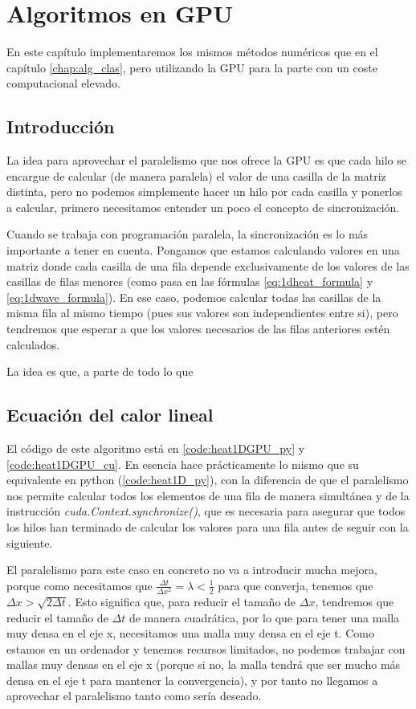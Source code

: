 \chapter{Algoritmos en \ac{GPU}}\label{cap:alg_gpu}
\begin{resumen}
	En este capítulo implementaremos los mismos métodos numéricos que en el capítulo \ref{chap:alg_clas}, pero utilizando la \ac{GPU} para la parte con un coste computacional elevado.
\end{resumen}
\section{Introducción}
La idea para aprovechar el paralelismo que nos ofrece la \ac{GPU} es que cada hilo se encargue de calcular (de manera paralela) el valor de una casilla de la matriz distinta, pero no podemos simplemente hacer un hilo por cada casilla y ponerlos a calcular, primero necesitamos entender un poco el concepto de sincronización.

Cuando se trabaja con programación paralela, la sincronización es lo más importante a tener en cuenta. Pongamos que estamos calculando valores en una matriz donde cada casilla de una fila depende exclusivamente de los valores de las casillas de filas menores (como pasa en las fórmulas \eqref{eq:1dheat_formula} y \eqref{eq:1dwave_formula}). En ese caso, podemos calcular todas las casillas de la misma fila al mismo tiempo (pues sus valores son independientes entre si), pero tendremos que esperar a que los valores necesarios de las filas anteriores estén calculados.

La idea es que, a parte de todo lo que 

\section{Ecuación del calor lineal}
El código de este algoritmo está en \ref{code:heat1DGPU_py} y \ref{code:heat1DGPU_cu}. En esencia hace prácticamente lo mismo que su equivalente en python (\ref{code:heat1D_py}), con la diferencia de que el paralelismo nos permite calcular todos los elementos de una fila de manera simultánea y de la instrucción \textit{cuda.Context.synchronize()}, que es necesaria para asegurar que todos los hilos han terminado de calcular los valores para una fila antes de seguir con la siguiente.

El paralelismo para este caso en concreto no va a introducir mucha mejora, porque como necesitamos que $\frac{\Delta t}{\Delta x^2}=\lambda<\frac{1}{2}$ para que converja, tenemos que $\Delta x > \sqrt{2\Delta t}$. Esto significa que, para reducir el tamaño de $\Delta x$, tendremos que reducir el tamaño de $\Delta t$ de manera cuadrática, por lo que para tener una malla muy densa en el eje x, necesitamos una malla muy densa en el eje t. Como estamos en un ordenador y tenemos recursos limitados, no podemos trabajar con mallas muy densas en el eje x (porque si no, la malla tendrá que ser mucho más densa en el eje t para mantener la convergencia), y por tanto no llegamos a aprovechar el paralelismo tanto como sería deseado.

